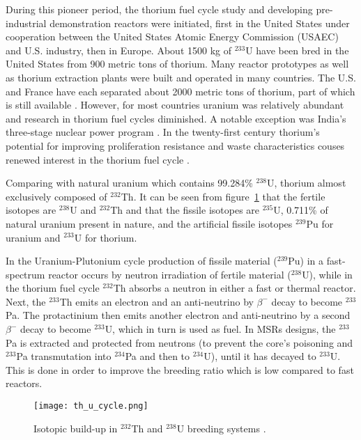 During this pioneer period, the thorium fuel cycle study and developing pre-industrial demonstration reactors were initiated, first in the United States under cooperation between the United States Atomic Energy Commission (USAEC) and U.S. industry, then in Europe. About 1500 kg of $^{233}$U have been bred in the United States from 900 metric tons of thorium. Many reactor prototypes as well as thorium extraction plants were built and operated in many countries. The U.S. and France have each separated about 2000 metric tons of thorium, part of which is still available \cite{lung_perspectives_1998}. However, for most countries uranium was relatively abundant and research in thorium fuel cycles diminished. A notable exception was India's three-stage nuclear power program \cite{natarajan_fast_2007}. In the twenty-first century thorium's potential for improving proliferation resistance and waste characteristics couses renewed interest in the thorium fuel cycle \cite{bagla_thorium_2015}.

Comparing with natural uranium which contains 99.284\% $^{238}$U, thorium almost exclusively composed of $^{232}$Th. It can be seen from figure~\ref{fig:th_cycle} that the fertile isotopes are $^{238}$U and $^{232}$Th and that the fissile isotopes are $^{235}$U, 0.711\% of natural uranium present in nature, and the artificial fissile isotopes $^{239}$Pu for uranium and $^{233}$U for thorium. 

In the Uranium-Plutonium cycle production of fissile material ($^{239}$Pu) in a fast-spectrum reactor occurs by neutron irradiation of fertile material ($^{238}$U), while in the thorium fuel cycle $^{232}$Th absorbs a neutron in either a fast or thermal reactor. Next, the $^{233}$Th emits an electron and an anti-neutrino by $\beta^-$ decay to become $^{233}$Pa. The protactinium then emits another electron and anti-neutrino by a second $\beta^-$ decay to become $^{233}$U, which in turn is used as fuel. In \glspl{MSR} designs, the $^{233}$Pa is extracted and protected from neutrons (to prevent the core's poisoning and $^{233}$Pa transmutation into $^{234}$Pa and then to $^{234}$U), until it has decayed to $^{233}$U. This is done in order to improve the breeding ratio which is low compared to fast reactors. 

\begin{figure}[t] %
  \centering
  \vspace{-0.3em}
  \texttt{[image: th\_u\_cycle.png]}
  \caption{Isotopic build-up in $^{232}$Th and $^{238}$U breeding systems \cite{eschbach_possible_1966}.}
  \vspace{-0.6em}
  \label{fig:th_cycle}
\end{figure}
\FloatBarrier

